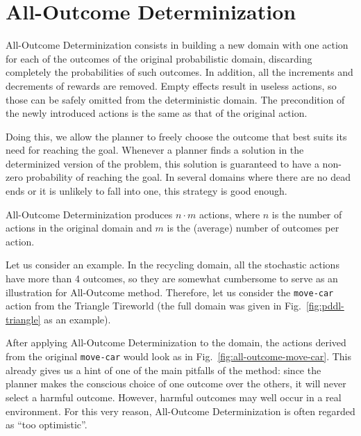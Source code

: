 \documentclass[../root.tex]{subfiles}
\begin{document}
\section{All-Outcome Determinization}

All-Outcome Determinization consists in building a new domain with one
action for each of the outcomes of the original probabilistic domain,
discarding completely the probabilities of such outcomes. 
In addition, all the increments and decrements of rewards are removed.
Empty effects
result in useless actions, so those can be safely omitted from the
deterministic domain.
The precondition
of the newly introduced actions is the same as that of the original action.

Doing this, we allow the planner to freely choose the outcome that best suits
its need for reaching the goal. Whenever a planner finds a solution in the
determinized version of the problem,
this solution is guaranteed to have a non-zero probability of reaching the goal.
In several domains where there are no dead ends or it is unlikely to fall into
one, this strategy is good enough.

All-Outcome Determinization produces $ n \cdot m $ actions, where
$ n $ is the number of actions in the original domain and $ m $ is the
(average) number of outcomes per action.

Let us consider an example. In the recycling domain, all the stochastic
actions have more than 4 outcomes, so they are somewhat cumbersome to serve
as an illustration for All-Outcome method.  Therefore, let us
consider the \texttt{move-car} action
from the Triangle Tireworld (the full domain was given in
Fig.~\ref{fig:pddl-triangle}
as an example).

After
applying All-Outcome Determinization to the domain, the actions derived
from the original \texttt{move-car} would look as in
Fig.~\ref{fig:all-outcome-move-car}. This already gives us a hint
of one of the main pitfalls of the method: since the planner makes
the conscious choice of one outcome over the others, it will never select
a harmful outcome. However, harmful outcomes may well occur in a real environment.
For this very reason, All-Outcome
Determinization is often regarded as ``too optimistic''.
\end{document}

